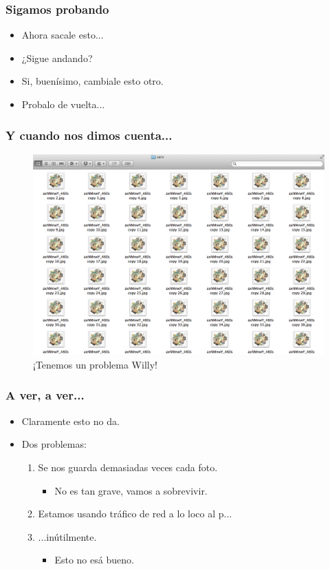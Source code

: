 \documentclass[ignorenonframetext,]{beamer}
\begin{document}
\begin{frame}\frametitle{Sigamos probando}
	\begin{itemize}[<+->]
		\item Ahora sacale esto...
		\item ¿Sigue andando?
		\item Si, buenísimo, cambiale esto otro.
		\item Probalo de vuelta...
	\end{itemize}
\end{frame}


\begin{frame}\frametitle{Y cuando nos dimos cuenta...}
	\begin{figure}[htbp]
		\centering
		\includegraphics[scale=0.23]{muchasCopias.png}
		\caption*{¡Tenemos un problema Willy!}
	\end{figure}
\end{frame}

\begin{frame}\frametitle{A ver, a ver...}
	\begin{itemize}[<+->]
		\item Claramente esto no da.
		\item Dos problemas:
		\begin{enumerate}[<+->]
			\item Se nos guarda demasiadas veces cada foto.
			\begin{itemize}[<+->]
				\item No es tan grave, vamos a sobrevivir.
			\end{itemize}
			\item Estamos usando tráfico de red a lo loco al p...
			\item ...inútilmente.
			\begin{itemize}
				\item Esto no esá bueno.
			\end{itemize}
		\end{enumerate}
	\end{itemize}
\end{frame}
\end{document}
